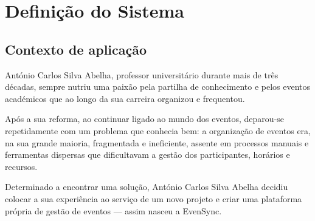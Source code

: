 \documentclass[runningheads]{llncs}
\begin{document}
\begin{abstract}
        \vspace{0.5cm}
        \noindent \textbf{Área de Aplicação:} Desenho e Arquitetura de Sistemas de Bases de Dados
        
        \noindent \textbf{Palavras-Chave:} Bases de Dados, Diagramas Entidade-Relacionamento, Modelo Relacional, Normalização de Bases de Dados Relacionais, Álgebra Relacional, SQL, MySQL
        \end{abstract}

        \newpage
        \renewcommand{\contentsname}{Índice}
        \renewcommand{\listfigurename}{Lista de Figuras}
        \renewcommand{\listtablename}{Lista de Tabelas}
        \pagestyle{plain}
        \tableofcontents
        \thispagestyle{plain}

        \newpage
        \listoffigures

        \newpage
        \listoftables
        
        \newpage

        \section{Definição do Sistema}
                \subsection{Contexto de aplicação}
                
                António Carlos Silva Abelha, professor universitário durante mais de três décadas, sempre nutriu uma paixão 
                pela partilha de conhecimento e pelos eventos académicos que ao longo da sua carreira organizou 
                e frequentou. 
                
                \vspace{0.3cm}
                Após a sua reforma, ao continuar ligado ao mundo dos eventos, deparou-se repetidamente 
                com um problema que conhecia bem: a organização de eventos era, na sua grande maioria, 
                fragmentada e ineficiente, assente em processos manuais e ferramentas dispersas que dificultavam 
                a gestão dos participantes, horários e recursos. 
                
                \vspace{0.3cm}
                Determinado a encontrar uma solução, António Carlos Silva Abelha decidiu colocar a sua experiência ao serviço de 
                um novo projeto e criar uma plataforma própria de gestão de eventos — assim nasceu a EvenSync.
                
\end{document}
